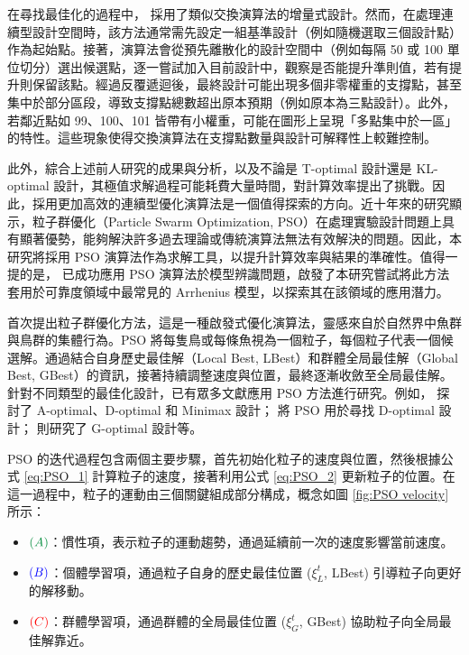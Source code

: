 \hspace*{8mm} 在尋找最佳化的過程中，\cite{atkinson1975design,atkinson1975optimal} 採用了類似交換演算法的增量式設計。然而，在處理連續型設計空間時，該方法通常需先設定一組基準設計（例如隨機選取三個設計點）作為起始點。接著，演算法會從預先離散化的設計空間中（例如每隔 50 或 100 單位切分）選出候選點，逐一嘗試加入目前設計中，觀察是否能提升準則值，若有提升則保留該點。經過反覆遞迴後，最終設計可能出現多個非零權重的支撐點，甚至集中於部分區段，導致支撐點總數超出原本預期（例如原本為三點設計）。此外，若鄰近點如 99、100、101 皆帶有小權重，可能在圖形上呈現「多點集中於一區」的特性。這些現象使得交換演算法在支撐點數量與設計可解釋性上較難控制。

\hspace*{8mm} 此外，綜合上述前人研究的成果與分析，以及不論是 T-optimal 設計還是 KL-optimal 設計，其極值求解過程可能耗費大量時間，對計算效率提出了挑戰。因此，採用更加高效的連續型優化演算法是一個值得探索的方向。近十年來的研究顯示，粒子群優化（Particle Swarm Optimization, PSO）在處理實驗設計問題上具有顯著優勢，能夠解決許多過去理論或傳統演算法無法有效解決的問題。因此，本研究將採用 PSO 演算法作為求解工具，以提升計算效率與結果的準確性。值得一提的是，\cite{chen2020hybrid} 已成功應用 PSO 演算法於模型辨識問題，啟發了本研究嘗試將此方法套用於可靠度領域中最常見的 Arrhenius 模型，以探索其在該領域的應用潛力。

\hspace*{8mm} \cite{eberhart1995new} 首次提出粒子群優化方法，這是一種啟發式優化演算法，靈感來自於自然界中魚群與鳥群的集體行為。PSO 將每隻鳥或每條魚視為一個粒子，每個粒子代表一個候選解。通過結合自身歷史最佳解（Local Best, LBest）和群體全局最佳解（Global Best, GBest）的資訊，接著持續調整速度與位置，最終逐漸收斂至全局最佳解。針對不同類型的最佳化設計，已有眾多文獻應用 PSO 方法進行研究。例如，\cite{chen2011optimal} 探討了 A-optimal、D-optimal 和 Minimax 設計；\cite{lukemire2016using} 將 PSO 用於尋找 D-optimal 設計；\cite{walsh2022fast} 則研究了 G-optimal 設計等。

\hspace*{8mm} PSO 的迭代過程包含兩個主要步驟，首先初始化粒子的速度與位置，然後根據公式 \eqref{eq:PSO_1} 計算粒子的速度，接著利用公式 \eqref{eq:PSO_2} 更新粒子的位置。在這一過程中，粒子的運動由三個關鍵組成部分構成，概念如圖 \ref{fig:PSO velocity} 所示：

\begin{itemize}
\item $\textcolor{PowerPointGreen}{(A)}$：慣性項，表示粒子的運動趨勢，通過延續前一次的速度影響當前速度。
\item $\textcolor{blue}{(B)}$：個體學習項，通過粒子自身的歷史最佳位置 ($\xi_L^{t}$, LBest) 引導粒子向更好的解移動。
\item $\textcolor{red}{(C)}$：群體學習項，通過群體的全局最佳位置 ($\xi_G^{t}$, GBest) 協助粒子向全局最佳解靠近。
\end{itemize}

